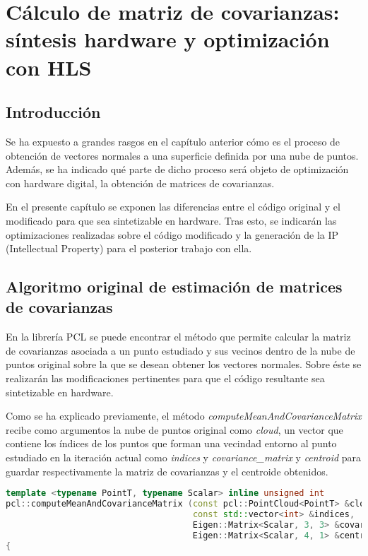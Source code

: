 \chapter{Cálculo de matriz de covarianzas: síntesis hardware y optimización con HLS}

\section{Introducción}
Se ha expuesto a grandes rasgos en el capítulo anterior cómo es el proceso de obtención de vectores normales a una superficie definida por una nube de puntos. Además, se ha indicado qué parte de dicho proceso será objeto de optimización con hardware digital, la obtención de matrices de covarianzas.

En el presente capítulo se exponen las diferencias entre el código original y el modificado para que sea sintetizable en hardware. Tras esto, se indicarán las optimizaciones realizadas sobre el código modificado y la generación de la IP (Intellectual Property) para el posterior trabajo con ella.




\section{Algoritmo original de estimación de matrices de covarianzas}

En la librería PCL se puede encontrar el método que permite calcular la matriz de covarianzas asociada a un punto estudiado y sus vecinos dentro de la nube de puntos original sobre la que se desean obtener los vectores normales. Sobre éste se realizarán las modificaciones pertinentes para que el código resultante sea sintetizable en hardware.

Como se ha explicado previamente, el método \textit{computeMeanAndCovarianceMatrix} recibe como argumentos la nube de puntos original como \textit{cloud}, un vector que contiene los índices de los puntos que forman una vecindad entorno al punto estudiado en la iteración actual como \textit{indices} y \textit{covariance\_matrix} y \textit{centroid} para guardar respectivamente la matriz de covarianzas y el centroide obtenidos.

\begin{lstlisting}[language=C++,breaklines]
  template <typename PointT, typename Scalar> inline unsigned int
pcl::computeMeanAndCovarianceMatrix (const pcl::PointCloud<PointT> &cloud,
                                     const std::vector<int> &indices,
                                     Eigen::Matrix<Scalar, 3, 3> &covariance_matrix,
                                     Eigen::Matrix<Scalar, 4, 1> &centroid)
{
\end{lstlisting}


